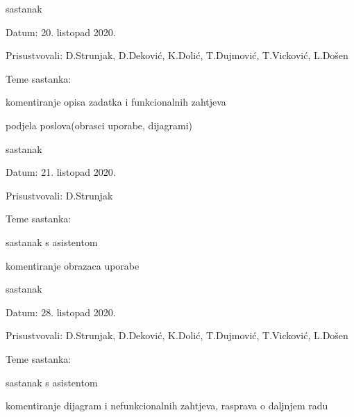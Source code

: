 \begin{packed_enum}
			\item  sastanak
			\item[] \begin{packed_item}
				\item Datum: 20. listopad 2020. 
				\item Prisustvovali: D.Strunjak, D.Deković, K.Dolić, T.Dujmović, T.Vicković, L.Došen
				\item Teme sastanka:
				\begin{packed_item}
					\item komentiranje opisa zadatka i funkcionalnih zahtjeva
					\item podjela poslova(obrasci uporabe, dijagrami)
				\end{packed_item}
			\end{packed_item}
		
			\item  sastanak
			\item[] \begin{packed_item}
				\item Datum: 21. listopad 2020. 
				\item Prisustvovali: D.Strunjak
				\item Teme sastanka:
				\begin{packed_item}
					\item sastanak s asistentom
					\item komentiranje obrazaca uporabe
				\end{packed_item}
			\end{packed_item}
		
			\item  sastanak
			\item[] \begin{packed_item}
				\item Datum: 28. listopad 2020. 
				\item Prisustvovali: D.Strunjak, D.Deković, K.Dolić, T.Dujmović, T.Vicković, L.Došen
				\item Teme sastanka:
				\begin{packed_item}
					\item sastanak s asistentom
					\item komentiranje dijagram i nefunkcionalnih zahtjeva, rasprava o daljnjem radu
				\end{packed_item}
			\end{packed_item}
		

\end{packed_enum}
